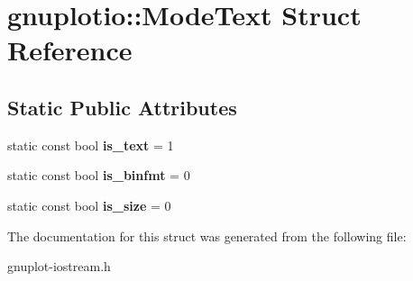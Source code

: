 \hypertarget{structgnuplotio_1_1ModeText}{}\section{gnuplotio\+:\+:Mode\+Text Struct Reference}
\label{structgnuplotio_1_1ModeText}
\subsection*{Static Public Attributes}
\begin{DoxyCompactItemize}
\item 
\mbox{\label{structgnuplotio_1_1ModeText_a7083d8977c354a036a7c542bf99d3d52}} 
static const bool {\bfseries is\+\_\+text} = 1
\item 
\mbox{\label{structgnuplotio_1_1ModeText_a4c771363d894ae64d6af961ffde35126}} 
static const bool {\bfseries is\+\_\+binfmt} = 0
\item 
\mbox{\label{structgnuplotio_1_1ModeText_aaffc1e7bb26c6d1404cb5a3f03f13be9}} 
static const bool {\bfseries is\+\_\+size} = 0
\end{DoxyCompactItemize}


The documentation for this struct was generated from the following file\+:\begin{DoxyCompactItemize}
\item 
gnuplot-\/iostream.\+h\end{DoxyCompactItemize}
